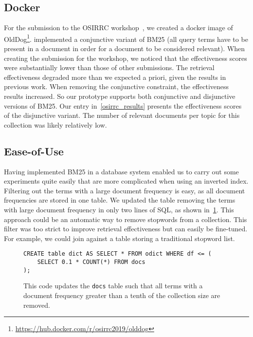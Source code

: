 \subsection{Docker}
For the submission to the OSIRRC workshop~\citep{OSIRRC}, we created a docker image of OldDog\footnote{\url{https://hub.docker.com/r/osirrc2019/olddog}}.  implemented a conjunctive variant of BM25 (all query terms have to be present in a document in order for a document to be considered relevant). When creating the submission for the workshop, we noticed that the effectiveness scores were substantially lower than those of other submissions. The retrieval effectiveness degraded more than we expected a priori, given the results in previous work. When removing the conjunctive constraint, the effectiveness results increased. So our prototype supports both conjunctive and disjunctive versions of BM25. Our entry in~\cref{osirrc_results} presents the effectiveness scores of the disjunctive variant. The number of relevant documents per topic for this collection was likely relatively low.

\subsection{Ease-of-Use}
Having implemented BM25 in a database system enabled us to carry out some experiments quite easily that are more complicated when using an inverted index. Filtering out the terms with a large document frequency is easy, as all document frequencies are stored in one table. We updated the table removing the terms with large document frequency in only two lines of SQL, as shown in~\cref{fig:remove-high-df}. This approach could be an automatic way to remove stopwords from a collection. This filter was too strict to improve retrieval effectiveness but can easily be fine-tuned. For example, we could join against a table storing a traditional stopword list. 

\begin{figure}
	\begin{verbatim}
CREATE table dict AS SELECT * FROM odict WHERE df <= (
	SELECT 0.1 * COUNT(*) FROM docs
);		
	\end{verbatim}
	\caption{This code updates the \texttt{docs} table such that all terms with a document frequency greater than a tenth of the collection size are removed.}
	\label{fig:remove-high-df}
\end{figure}

